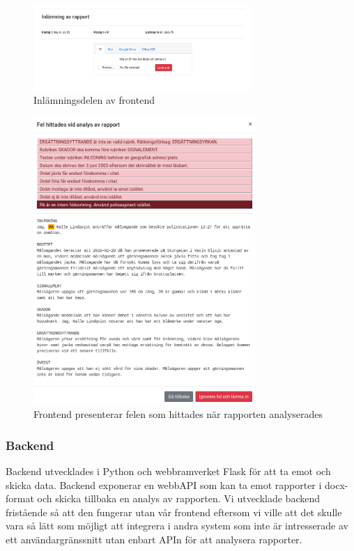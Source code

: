\documentclass[swedish]{maucsthesis}
\begin{document}
\begin{figure}[H]
    \centering
    \includegraphics[width=0.74\textwidth]{frontendstart.png}
    \caption{Inlämningsdelen av frontend}
    \label{fig:frontendstart}
\end{figure}

\begin{figure}[H]
    \centering
    \includegraphics[width=0.75\textwidth]{frontenderrors.png}
    \caption{Frontend presenterar felen som hittades när rapporten analyserades}
    \label{fig:frontenderrors}
\end{figure}

\subsubsection{Backend}

Backend utvecklades i Python och webbramverket Flask för att ta emot och skicka
data. Backend exponerar en webbAPI som kan ta emot rapporter i docx-format
och skicka tillbaka en analys av rapporten. Vi utvecklade backend
fristående så att den fungerar utan vår frontend eftersom vi ville att det
skulle vara så lätt som möjligt att integrera i andra system som inte är
intresserade av ett användargränssnitt utan enbart APIn för att analysera
rapporter.
\end{document}
